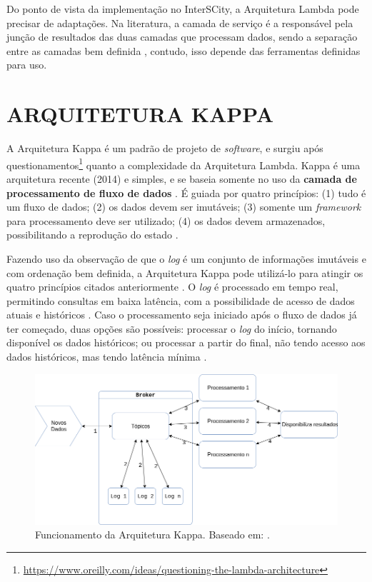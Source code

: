 Do ponto de vista da implementação no InterSCity, a Arquitetura Lambda pode
precisar de adaptações. Na literatura, a camada de serviço é a
responsável pela junção de resultados das duas camadas que processam dados,
sendo a separação entre as camadas bem definida \cite{marz2015}, contudo, isso
depende das ferramentas definidas para uso. 

\section{ARQUITETURA KAPPA}

A Arquitetura Kappa é um padrão de projeto de \textit{software}, e surgiu após
questionamentos\footnote{\url{https://www.oreilly.com/ideas/questioning-the-lambda-architecture}}
quanto a complexidade da Arquitetura Lambda. Kappa é uma arquitetura recente (2014) e
simples, e se baseia somente no uso da \textbf{camada de processamento de fluxo
de dados} \cite{seyvet2016}. É guiada por quatro princípios: (1) tudo é um
fluxo de dados; (2) os dados devem ser imutáveis; (3) somente um
\textit{framework} para processamento deve ser utilizado; (4) os dados devem
armazenados, possibilitando a reprodução do estado \cite{seyvet2016}.

Fazendo uso da observação de que o \textit{log} é um conjunto de informações
imutáveis e com ordenação bem definida, a Arquitetura Kappa pode utilizá-lo
para atingir os quatro princípios citados anteriormente \cite{kreps2014}. O
\textit{log} é processado em tempo real, permitindo consultas em baixa
latência, com a possibilidade de acesso de dados atuais e históricos
\cite{forgeat2015}. Caso o processamento seja iniciado após o fluxo de dados já
ter começado, duas opções são possíveis: processar o \textit{log} do início,
tornando disponível os dados históricos; ou processar a partir do final,
não tendo acesso aos dados históricos, mas tendo latência mínima
\cite{kreps2014}.

\begin{figure}[hbt]
  \centering
    \includegraphics[scale=0.5]{figuras/kappa_architecture.png}
    \caption{Funcionamento da Arquitetura Kappa. Baseado em: .}
  \label{fig:kappa-lifecycle}
\end{figure}


